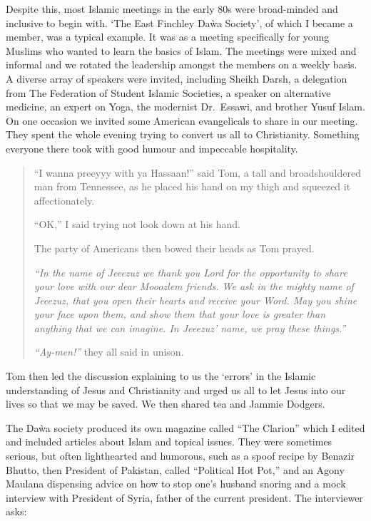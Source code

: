 \documentclass[12pt]{memoir}
\begin{document}
Despite this, most Islamic meetings in the early 80s
were broad-minded and inclusive to begin with.
‘The East Finchley Da\`wa Society’, of which I became a member,
was a typical example.
It was as a meeting specifically for young Muslims
who wanted to learn the basics of Islam.
The meetings were mixed and informal
and we rotated the leadership amongst the members on a weekly basis.
A diverse array of speakers were invited, including Sheikh Darsh,
a delegation from The Federation of Student Islamic Societies,
a speaker on alternative medicine, an expert on Yoga,
the modernist Dr.\ Essawi, and brother Yusuf Islam.
On one occasion we invited some American evangelicals to share in our meeting.
They spent the whole evening trying to convert us all to Christianity.
Something everyone there took with good humour and impeccable hospitality.

\begin{quote}
“I wanna preeyyy with ya Hassaan!” said Tom,
a tall and broad\–shouldered man from Tennessee,
as he placed his hand on my thigh and squeezed it affectionately.

“OK,” I said trying not look down at his hand.

The party of Americans then bowed their heads as Tom prayed.

\emph{“In the name of Jeeezuz we thank you Lord
for the opportunity to share your love with our dear Mooozlem friends.
We ask in the mighty name of Jeeezuz,
that you open their hearts and receive your Word.
May you shine your face upon them,
and show them that your love is greater than anything that we can imagine.
In Jeeezuz’ name, we pray these things.”}

\emph{“Ay-men!”} they all said in unison.
\end{quote}

Tom then led the discussion explaining to us the ‘errors’
in the Islamic understanding of Jesus and Christianity
and urged us all to let Jesus into our lives so that we may be saved.
We then shared tea and Jammie Dodgers.

The Da\`wa society produced its own magazine called “The Clarion”
which I edited and included articles about Islam and topical issues.
They were sometimes serious, but often light\–hearted and humorous,
such as a spoof recipe by Benazir Bhutto,
then President of Pakistan, called “Political Hot Pot,”
and an Agony Maulana dispensing advice on how to stop one’s husband snoring
and a mock interview with President
 of Syria,
father of the current president.
The interviewer asks:
\end{document}
